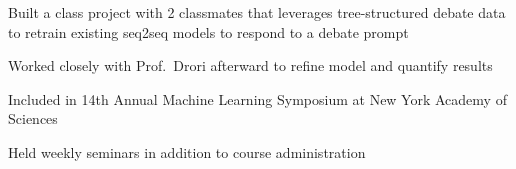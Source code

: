 \documentclass[letterpaper]{deedy-resume} %
\begin{document}
\begin{minipage}[t]{0.66\textwidth}
\sectionspace %



\begin{tightitemize}
  \item Built a class project with 2 classmates that leverages tree-structured debate data to retrain existing seq2seq models to respond to a debate prompt
  \item Worked closely with Prof.\ Drori afterward to refine model and quantify results
  \item Included in 14th Annual Machine Learning Symposium at New York Academy of Sciences
\end{tightitemize}

\sectionspace %



\begin{tightitemize}
    \item  Held weekly seminars in addition to course administration
\end{tightitemize}

\sectionspace %



\end{minipage}
\end{document}

